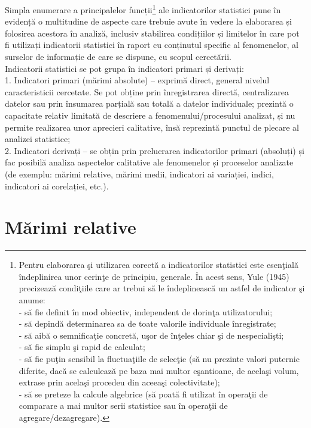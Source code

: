 \documentclass[
  11pt,
  b5paper,
  nottoc]{book}
\begin{document}
Simpla enumerare a principalelor funcții\footnote{Pentru elaborarea şi
  utilizarea corectă a indicatorilor statistici este esenţială
  îndeplinirea unor cerinţe de principiu, generale. În acest sens, Yule
  (1945) precizează condiţiile care ar trebui să le îndeplinească un
  astfel de indicator şi anume:\\
  - să fie definit în mod obiectiv, independent de dorinţa
  utilizatorului;\\
  - să depindă determinarea sa de toate valorile individuale
  înregistrate;\\
  - să aibă o semnificaţie concretă, uşor de înţeles chiar şi de
  nespecialişti;\\
  - să fie simplu şi rapid de calculat;\\
  - să fie puţin sensibil la fluctuaţiile de selecţie (să nu prezinte
  valori puternic diferite, dacă se calculează pe baza mai multor
  eşantioane, de acelaşi volum, extrase prin acelaşi procedeu din
  aceeaşi colectivitate);\\
  - să se preteze la calcule algebrice (să poată fi utilizat în operaţii
  de comparare a mai multor serii statistice sau în operaţii de
  agregare/dezagregare).} ale indicatorilor statistici pune în evidență
o multitudine de aspecte care trebuie avute în vedere la elaborarea și
folosirea acestora în analiză, inclusiv stabilirea condițiilor și
limitelor în care pot fi utilizați indicatorii statistici în raport cu
conținutul specific al fenomenelor, al surselor de informație de care se
dispune, cu scopul cercetării.\\
Indicatorii statistici se pot grupa în indicatori primari și derivați:\\
1. Indicatori primari (mărimi absolute) -- exprimă direct, general
nivelul caracteristicii cercetate. Se pot obține prin înregistrarea
directă, centralizarea datelor sau prin însumarea parțială sau totală a
datelor individuale; prezintă o capacitate relativ limitată de descriere
a fenomenului/procesului analizat, și nu permite realizarea unor
aprecieri calitative, însă reprezintă punctul de plecare al analizei
statistice;\\
2. Indicatori derivați -- se obțin prin prelucrarea indicatorilor
primari (absoluți) și fac posibilă analiza aspectelor calitative ale
fenomenelor și proceselor analizate (de exemplu: mărimi relative, mărimi
medii, indicatori ai variației, indici, indicatori ai corelației, etc.).

\hypertarget{mux103rimi-relative}{%
\section{Mărimi relative}\label{mux103rimi-relative}}
\end{document}

